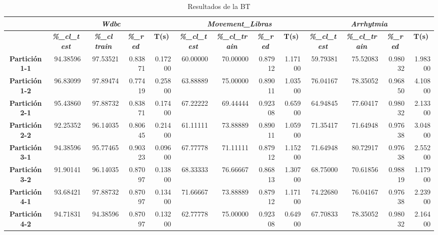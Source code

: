 \documentclass[a4paper,11pt]{article}
\begin{document}
  \begin{table}[htbp]	
    \caption*{Resultados de la BT}
    \begin{adjustbox}{width=1.1\textwidth}
    \begin{tabular}{|c|r|r|r|r|r|r|r|r|r|r|r|r|}
    \hline
    \multicolumn{1}{|l|}{} & \multicolumn{ 4}{c|}{\textbf{\textit{Wdbc}}} & \multicolumn{ 4}{c|}{\textbf{\textit{Movement\_Libras}}} & \multicolumn{ 4}{c|}{\textbf{\textit{Arrhytmia}}} \\ \hline
    \multicolumn{1}{|l|}{} & \multicolumn{1}{c|}{\textbf{\textit{\%\_cl\_test}}} & \multicolumn{1}{c|}{\textbf{\textit{\%\_cl train}}} & \multicolumn{1}{c|}{\textbf{\textit{\%\_red}}} & \multicolumn{1}{c|}{\textbf{T(s)}} & \multicolumn{1}{c|}{\textbf{\textit{\%\_cl\_test}}} & \multicolumn{1}{c|}{\textbf{\textit{\%\_cl\_train}}} & \multicolumn{1}{c|}{\textbf{\textit{\%\_red}}} & \multicolumn{1}{c|}{\textbf{T(s)}} & \multicolumn{1}{c|}{\textbf{\textit{\%\_cl\_test}}} & \multicolumn{1}{c|}{\textbf{\textit{\%\_cl\_train}}} & \multicolumn{1}{c|}{\textbf{\textit{\%\_red}}} & \multicolumn{1}{c|}{\textbf{T(s)}} \\ \hline
    \textbf{Partición 1-1} & 94.38596 & 97.53521 & 0.83871 & 0.17200 & 60.00000 & 70.00000 & 0.87912 & 1.17100 & 59.79381 & 75.52083 & 0.98032 & 1.98300 \\ \hline
    \textbf{Partición 1-2} & 96.83099 & 97.89474 & 0.77419 & 0.25800 & 63.88889 & 75.00000 & 0.89011 & 1.03500 & 76.04167 & 78.35052 & 0.96850 & 4.10800 \\ \hline
    \textbf{Partición 2-1} & 95.43860 & 97.88732 & 0.83871 & 0.17400 & 67.22222 & 69.44444 & 0.92308 & 0.65900 & 64.94845 & 77.60417 & 0.98032 & 2.13300 \\ \hline
    \textbf{Partición 2-2} & 92.25352 & 96.14035 & 0.80645 & 0.21400 & 61.11111 & 73.88889 & 0.89011 & 1.05900 & 71.35417 & 71.64948 & 0.97638 & 3.04800 \\ \hline
    \textbf{Partición 3-1} & 94.38596 & 95.77465 & 0.90323 & 0.09600 & 67.77778 & 71.11111 & 0.87912 & 1.15200 & 71.64948 & 80.72917 & 0.97638 & 2.55200 \\ \hline
    \textbf{Partición 3-2} & 91.90141 & 96.14035 & 0.87097 & 0.13800 & 68.33333 & 76.66667 & 0.86813 & 1.30700 & 68.75000 & 70.61856 & 0.98819 & 1.17900 \\ \hline
    \textbf{Partición 4-1} & 93.68421 & 97.88732 & 0.87097 & 0.13400 & 71.66667 & 73.88889 & 0.87912 & 1.17100 & 74.22680 & 76.04167 & 0.97638 & 2.23900 \\ \hline
    \textbf{Partición 4-2} & 94.71831 & 94.38596 & 0.87097 & 0.13200 & 62.77778 & 75.00000 & 0.92308 & 0.64900 & 67.70833 & 78.35052 & 0.98032 & 2.16400 \\ \hline

\end{tabular}
\end{adjustbox}
\end{table}
\end{document}
